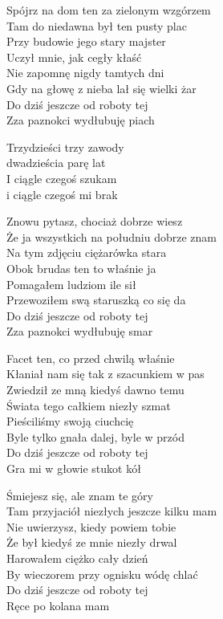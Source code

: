 \begin{text}
    
    Spójrz na dom ten za zielonym wzgórzem\\
    Tam do niedawna był ten pusty plac\\
    Przy budowie jego stary majster\\
    Uczył mnie, jak cegły kłaść\\
    Nie zapomnę nigdy tamtych dni\\
    Gdy na głowę z nieba lał się wielki żar\\
    Do dziś jeszcze od roboty tej\\
    Zza paznokci wydłubuję piach

    \vin Trzydzieści trzy zawody\\
    \vin dwadzieścia parę lat\\
    \vin I ciągle czegoś szukam\\
    \vin i ciągle czegoś mi brak

    Znowu pytasz, chociaż dobrze wiesz\\
    Że ja wszystkich na południu dobrze znam\\
    Na tym zdjęciu ciężarówka stara\\
    Obok brudas ten to właśnie ja\\
    Pomagałem ludziom ile sił\\
    Przewoziłem swą staruszką co się da\\
    Do dziś jeszcze od roboty tej\\
    Zza paznokci wydłubuję smar

    Facet ten, co przed chwilą właśnie\\
    Kłaniał nam się tak z szacunkiem w pas\\
    Zwiedził ze mną kiedyś dawno temu\\
    Świata tego całkiem niezły szmat\\
    Pieściliśmy swoją ciuchcię\\
    Byle tylko gnała dalej, byle w przód\\
    Do dziś jeszcze od roboty tej\\
    Gra mi w głowie stukot kół

    Śmiejesz się, ale znam te góry\\
    Tam przyjaciół niezłych jeszcze kilku mam\\
    Nie uwierzysz, kiedy powiem tobie\\
    Że był kiedyś ze mnie niezły drwal\\
    Harowałem ciężko cały dzień\\
    By wieczorem przy ognisku wódę chlać\\
    Do dziś jeszcze od roboty tej\\
    Ręce po kolana mam


\end{text}
